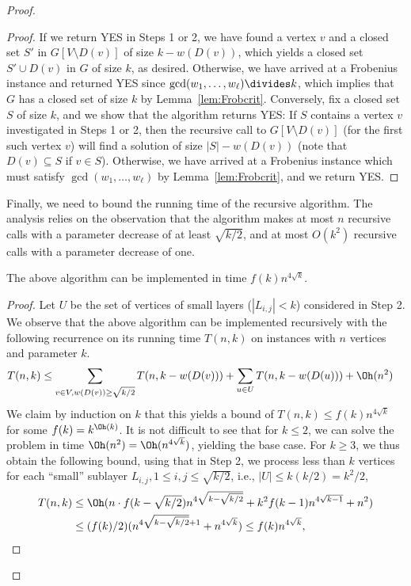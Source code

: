 \begin{proof}
\begin{proof}
If we return YES in Steps 1 or 2, we have found a vertex $v$ and a closed set $S'$ in $G[V\setminus D(v)]$ of size $k-w(D(v))$, which yields a closed set $S'\cup D(v)$ in $G$ of size $k$, as desired. Otherwise, we have arrived at a Frobenius instance and returned YES since $\gcd(w_1,\dots, w_\ell)\divides k$, which implies that $G$ has a closed set of size $k$ by Lemma~\ref{lem:Frobcrit}.
%
Conversely, fix a closed set $S$ of size $k$, and we show that the algorithm returns YES:
If $S$ contains a vertex $v$ investigated in Steps 1 or 2, then the recursive call to $G[V\setminus D(v)]$ (for the first such vertex $v$) will find a solution of size $|S|-w(D(v))$ (note that $D(v) \subseteq S$ if $v\in S$). Otherwise, we have arrived at a Frobenius instance which must satisfy $\gcd(w_1,\dots, w_\ell)$ by Lemma~\ref{lem:Frobcrit}, and we return YES.
\cqed\end{proof}
%
Finally, we need to bound the running time of the recursive algorithm. The analysis relies on the observation that the algorithm makes at most $n$ recursive calls with a parameter decrease of at least $\sqrt{k/2}$, and at most $O(k^2)$ recursive calls with a parameter decrease of one.
\begin{claim}\label{cl:imp2}
The above algorithm can be implemented in time $f(k) n^{4\sqrt{k}}$.
\end{claim}
\begin{proof}
Let $U$ be the set of vertices of small layers ($|L_{i,j}| < k$) considered in Step 2. We observe that the above algorithm can be implemented recursively with the following recurrence on its running time $T(n,k)$ on instances with $n$ vertices and parameter $k$.
\begin{align*}
T(n,k) & \le \sum_{v\in V, w(D(v)) \ge \sqrt{k/2}} T(n, k-w(D(v))) + \sum_{u \in U} T(n,k-w(D(u))) + \Oh(n^2) 
\end{align*}
We claim by induction on $k$ that this yields a bound of $T(n,k) \le f(k) n^{4\sqrt{k}}$ for some $f(k) = k^{\Oh(k)}$. It is not difficult to see that for $k\le 2$, we can solve the problem in time $\Oh(n^2) = \Oh(n^{4\sqrt{k}})$, yielding the base case. For $k\ge 3$, we thus obtain the following bound, using that in Step 2, we process less than $k$ vertices for each ``small'' sublayer $L_{i,j}, 1\le i,j \le \sqrt{k/2}$, i.e., $|U|\le k (k/2) = k^2/2$,
\begin{align*}
T(n,k) & \le \Oh(n \cdot f(k-\sqrt{k/2}) n^{4\sqrt{k-\sqrt{k/2}}} + k^2 f(k-1) n^{4\sqrt{k-1}} + n^2) \\
   & \le (f(k)/2) (n^{4\sqrt{k-\sqrt{k/2}}+1} + n^{4\sqrt{k}}) \le f(k)n^{4\sqrt{k}},

\end{align*}
\end{proof}
\end{proof}
